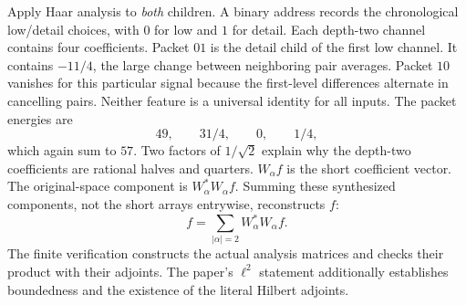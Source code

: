 Apply Haar analysis to \emph{both} children. A binary address records the chronological low/detail choices, with $0$ for low and $1$ for detail. Each depth-two channel contains four coefficients.
Packet $01$ is the detail child of the first low channel. It contains $-11/4$, the large change between neighboring pair averages. Packet $10$ vanishes for this particular signal because the first-level differences alternate in cancelling pairs. Neither feature is a universal identity for all inputs.
The packet energies are
\[
49,\qquad 31/4,\qquad 0,\qquad 1/4,
\]
which again sum to $57$. Two factors of $1/\sqrt2$ explain why the depth-two coefficients are rational halves and quarters.
$W_\alpha f$ is the short coefficient vector. The original-space component is $W_\alpha^*W_\alpha f$. Summing these synthesized components, not the short arrays entrywise, reconstructs $f$:
\[
f=\sum_{|\alpha|=2}W_\alpha^*W_\alpha f.
\]
The finite verification constructs the actual analysis matrices and checks their product with their adjoints. The paper's $\ell^2$ statement additionally establishes boundedness and the existence of the literal Hilbert adjoints.

